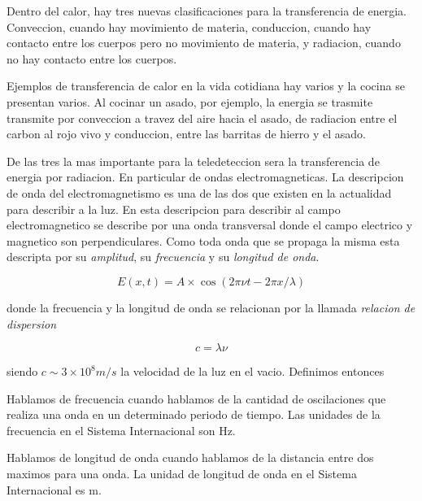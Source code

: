 Dentro del calor, hay tres nuevas clasificaciones para la transferencia de
energia. Conveccion, cuando hay movimiento de materia, conduccion, cuando hay
contacto entre los cuerpos pero no movimiento de materia, y radiacion, cuando no
hay contacto entre los cuerpos.

\begin{exa}
  Ejemplos de transferencia de calor en la vida cotidiana hay varios y la cocina
  se presentan varios. Al cocinar un asado, por ejemplo, la energia se trasmite
  transmite por conveccion a travez del aire hacia el asado, de radiacion entre
  el carbon al rojo vivo y conduccion, entre las barritas de hierro y el asado.
\end{exa}

De las tres la mas importante para la teledeteccion sera la transferencia de
energia por radiacion. En particular de ondas electromagneticas. La descripcion
de onda del electromagnetismo es una de las dos que existen en la actualidad
para describir a la luz. En esta descripcion para describir al campo
electromagnetico se describe por una onda transversal donde el campo electrico y
magnetico son perpendiculares. Como toda onda que se propaga la misma esta
descripta por su \emph{amplitud}, su \emph{frecuencia} y su \emph{longitud de
onda}.

\begin{equation}
  E(x,t) = A \times \cos(2\pi \nu t - 2\pi x / \lambda)
\end{equation}

donde la frecuencia y la longitud de onda se relacionan por la llamada
\emph{relacion de dispersion}

\begin{equation}
  c = \lambda \nu
\end{equation}

siendo $c\sim 3\times 10^8 m/s$ la velocidad de la luz en el vacio. Definimos
entonces

\begin{dex}
  Hablamos de frecuencia cuando hablamos de la cantidad de oscilaciones que
  realiza una onda en un determinado periodo de tiempo. Las unidades de la
  frecuencia en el Sistema Internacional son Hz.
\end{dex}

\begin{dex}
  Hablamos de longitud de onda cuando hablamos de la distancia entre dos maximos
  para una onda. La unidad de longitud de onda en el Sistema Internacional es m.
\end{dex}

